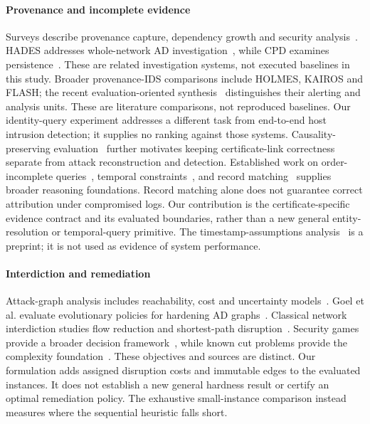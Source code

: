 \paragraph{Provenance and incomplete evidence}
Surveys describe provenance capture, dependency growth and security analysis~\cite{zipperle2023survey,provenance2023security}. HADES addresses whole-network AD investigation~\cite{liu2026hades}, while CPD examines persistence~\cite{liu2026cpd}. These are related investigation systems, not executed baselines in this study. Broader provenance-IDS comparisons include HOLMES, KAIROS and FLASH; the recent evaluation-oriented synthesis~\cite{ipekbayrak2026evaluation} distinguishes their alerting and analysis units. These are literature comparisons, not reproduced baselines. Our identity-query experiment addresses a different task from end-to-end host intrusion detection; it supplies no ranking against those systems. Causality-preserving evaluation~\cite{suarez2025structure} further motivates keeping certificate-link correctness separate from attack reconstruction and detection. Established work on order-incomplete queries~\cite{amarilli2019computing}, temporal constraints~\cite{dechter1991temporal}, and record matching~\cite{elmagarmid2007duplicate} supplies broader reasoning foundations. Record matching alone does not guarantee correct attribution under compromised logs. Our contribution is the certificate-specific evidence contract and its evaluated boundaries, rather than a new general entity-resolution or temporal-query primitive. The timestamp-assumptions analysis~\cite{heinzl2026timestamps} is a preprint; it is not used as evidence of system performance.

\paragraph{Interdiction and remediation}
Attack-graph analysis includes reachability, cost and uncertainty models~\cite{zeng2019attackgraphs}. Goel et al. evaluate evolutionary policies for hardening AD graphs~\cite{goel2024hardening}. Classical network interdiction studies flow reduction and shortest-path disruption~\cite{wood1993interdiction,israeli2002shortest}. Security games provide a broader decision framework~\cite{tambe2011security}, while known cut problems provide the complexity foundation~\cite{garg1994multiway,dahlhaus1994multiterminal}. These objectives and sources are distinct. Our formulation adds assigned disruption costs and immutable edges to the evaluated instances. It does not establish a new general hardness result or certify an optimal remediation policy. The exhaustive small-instance comparison instead measures where the sequential heuristic falls short.

